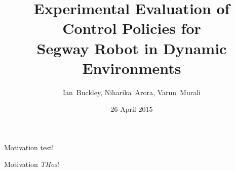 \documentclass[10pt]{beamer}
\title{Experimental Evaluation of Control Policies for \\Segway Robot in Dynamic Environments }
\author{Ian~Buckley, Niharika~Arora, Varun~Murali}
\date{26 April 2015}
\institute{Institute of Robotics and Intelligent Machines}
\begin{document}
\maketitle
\begin{frame}{Motivation}
test!
\end{frame}

\begin{frame}{Motivation}
\emph{THos}!
\end{frame}
\end{document}
